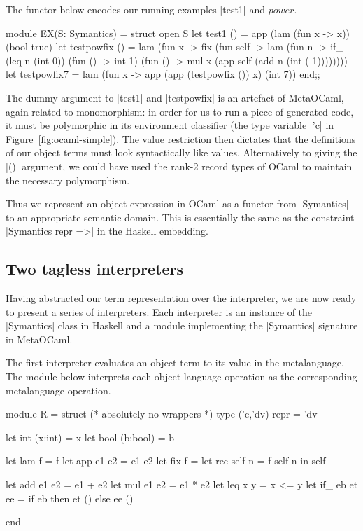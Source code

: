 \documentclass[preprint]{sigplanconf}
\begin{document}
The functor below encodes our running examples |test1| and $\mathit{power}$.
\begin{code}
module EX(S: Symantics) = struct
  open S
  let test1 () =
    app (lam (fun x -> x)) (bool true)
  let testpowfix () = 
    lam (fun x -> fix (fun self -> lam (fun n ->
    if_ (leq n (int 0)) (fun () -> int 1)
        (fun () -> mul x
          (app self (add n (int (-1))))))))
  let testpowfix7 = 
     lam (fun x -> app (app (testpowfix ()) x)
                       (int 7))
end;;
\end{code}
The dummy argument to |test1| and |testpowfix| is an artefact of
MetaOCaml, again related to monomorphism: in order for us to run a
piece of generated code, it must be polymorphic in its environment
classifier (the type variable |'c| in Figure~\ref{fig:ocaml-simple}).
The value restriction then dictates that
the definitions of our object terms must look syntactically like
values. Alternatively to giving the |()| argument, we could have used
the rank-2 record types of OCaml to maintain the necessary polymorphism.

Thus we represent an object expression in
OCaml as a functor from |Symantics| to an appropriate semantic domain. This
is essentially the same as the constraint |Symantics repr =>| in the
Haskell embedding.

\subsection{Two tagless interpreters}
\label{S:interpreter-RL}

Having abstracted our term representation over the interpreter, we are
now ready to present a series of interpreters.  Each interpreter is an
instance of the |Symantics| class in Haskell and a module implementing
the |Symantics| signature in MetaOCaml.

The first interpreter evaluates an object term to its value in the
metalanguage.  The module below interprets each object\hyp language
operation as the corresponding metalanguage operation.
\begin{code}
module R = struct
  (* absolutely no wrappers *)
  type ('c,'dv) repr = 'dv

  let int  (x:int)  = x
  let bool (b:bool) = b

  let lam  f        = f
  let app  e1 e2    = e1 e2
  let fix  f        =
    let rec self n = f self n in self

  let add  e1 e2    = e1 + e2
  let mul  e1 e2    = e1 * e2
  let leq  x y      = x <= y
  let if_  eb et ee = if eb then et () else ee ()

end
\end{code}
\end{document}
